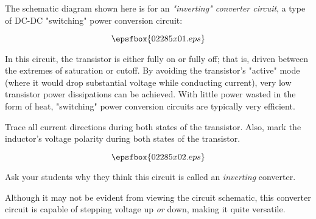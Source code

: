 

The schematic diagram shown here is for an {\it "inverting" converter circuit}, a type of DC-DC "switching" power conversion circuit:

$$\epsfbox{02285x01.eps}$$

In this circuit, the transistor is either fully on or fully off; that is, driven between the extremes of saturation or cutoff.  By avoiding the transistor's "active" mode (where it would drop substantial voltage while conducting current), very low transistor power dissipations can be achieved.  With little power wasted in the form of heat, "switching" power conversion circuits are typically very efficient.

Trace all current directions during both states of the transistor.  Also, mark the inductor's voltage polarity during both states of the transistor.







$$\epsfbox{02285x02.eps}$$







Ask your students why they think this circuit is called an {\it inverting} converter.  

Although it may not be evident from viewing the circuit schematic, this converter circuit is capable of stepping voltage up {\it or} down, making it quite versatile.




